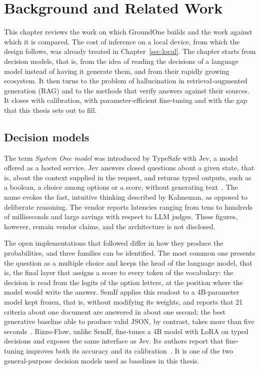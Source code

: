 \chapter{Background and Related Work}
\label{sec:background}


This chapter reviews the work on which GroundOne builds and the work against which it is compared. The cost of inference
on a local device, from which the design follows, was already treated in Chapter~\ref{sec:local}. The chapter starts
from decision models, that is, from the idea of reading the decisions of a language model instead of having it generate
them, and from their rapidly growing ecosystem. It then turns to the problem of hallucination in retrieval-augmented
generation (RAG) and to the methods that verify answers against their sources. It closes with calibration, with
parameter-efficient fine-tuning and with the gap that this thesis sets out to fill.

\section{Decision models}
\label{sec:bg-systemone}

The term \emph{System One model} was introduced by TypeSafe with Jev, a model offered as a hosted service. Jev answers
closed questions about a given state, that is, about the context supplied in the request, and returns typed outputs,
such as a boolean, a choice among options or a score, without generating text~\cite{typesafe2026jev}. The name evokes
the fast, intuitive thinking described by Kahneman, as opposed to deliberate reasoning. The vendor reports latencies
ranging from tens to hundreds of milliseconds and large savings with respect to LLM judges. These figures,
however, remain vendor claims, and the architecture is not disclosed.

The open implementations that followed differ in how they produce the probabilities, and three families can be
identified. The most common one presents the question as a multiple choice and keeps the head of the language model,
that is, the final layer that assigns a score to every token of the vocabulary: the decision is read from the logits of
the option letters, at the position where the model would write the answer. SemIf applies this readout to a 4B-parameter
model kept frozen, that is, without modifying its weights, and reports that 21 criteria about one document are answered
in about one second; the best generative baseline able to produce valid JSON, by contrast, takes more than five
seconds~\cite{semif}. Rizzo-Flow, unlike SemIf, fine-tunes a 4B model with LoRA on typed decisions and exposes the same
interface as Jev. Its authors report that fine-tuning improves both its accuracy and its calibration~\cite{rizzoflow}.
It is one of the two general-purpose decision models used as baselines in this thesis.

